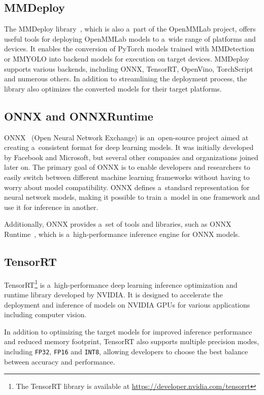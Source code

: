 \subsection{MMDeploy}

The MMDeploy library~\cite{MMDeploy}, which is also a~part of the OpenMMLab project,
offers useful tools for deploying OpenMMLab models to a~wide range of platforms
and devices. It enables the conversion of PyTorch models trained with
MMDetection or MMYOLO into backend models for execution on target devices.
MMDeploy supports various backends, including ONNX, TensorRT, OpenVino,
TorchScript and numerous others. In addition to streamlining the deployment
process, the library also optimizes the converted models for their target
platforms.


\subsection{ONNX and ONNXRuntime}

ONNX~\cite{ONNX} (Open Neural Network Exchange) is an~open-source project aimed
at creating a~consistent format for deep learning models. It was initially
developed by Facebook and Microsoft, but several other companies and
organizations joined later on. The primary goal of ONNX is to enable developers
and researchers to easily switch between different machine learning frameworks
without having to worry about model compatibility. ONNX defines a~standard
representation for neural network models, making it possible to train a~model in
one framework and use it for inference in another.

Additionally, ONNX provides a~set of tools and libraries, such as ONNX
Runtime~\cite{ONNXRuntime}, which is a~high-performance inference engine for
ONNX models.


\subsection{TensorRT}

TensorRT\footnote{The TensorRT library is available at
\url{https://developer.nvidia.com/tensorrt}} is a~high-performance deep learning
inference optimization and runtime library developed by NVIDIA. It is designed
to accelerate the deployment and inference of models on NVIDIA GPUs for various
applications including computer vision.

In addition to optimizing the target models for improved inference
performance and reduced memory footprint, TensorRT also supports multiple
precision modes, including \texttt{FP32}, \texttt{FP16} and \texttt{INT8},
allowing developers to choose the best balance between accuracy and performance.


